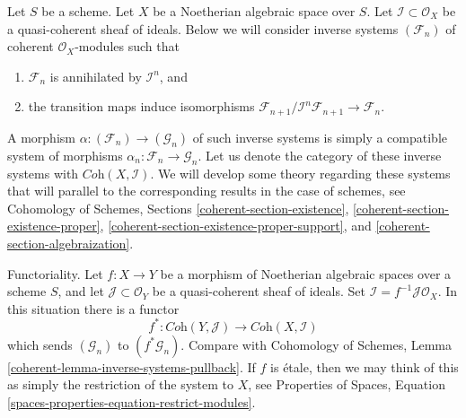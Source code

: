 \medskip\noindent
Let $S$ be a scheme. Let $X$ be a Noetherian algebraic space over $S$.
Let $\mathcal{I} \subset \mathcal{O}_X$ be a quasi-coherent sheaf of ideals.
Below we will consider inverse systems $(\mathcal{F}_n)$ of coherent
$\mathcal{O}_X$-modules such that
\begin{enumerate}
\item $\mathcal{F}_n$ is annihilated by $\mathcal{I}^n$, and
\item the transition maps induce isomorphisms
$\mathcal{F}_{n + 1}/\mathcal{I}^n\mathcal{F}_{n + 1} \to \mathcal{F}_n$.
\end{enumerate}
A morphism $\alpha : (\mathcal{F}_n) \to (\mathcal{G}_n)$
of such inverse systems is simply a compatible system of morphisms
$\alpha_n : \mathcal{F}_n \to \mathcal{G}_n$.
Let us denote the category of these inverse systems with
$\textit{Coh}(X, \mathcal{I})$. We will develop some theory regarding
these systems that will parallel to the corresponding
results in the case of schemes, see
Cohomology of Schemes, Sections \ref{coherent-section-existence},
\ref{coherent-section-existence-proper},
\ref{coherent-section-existence-proper-support}, and
\ref{coherent-section-algebraization}.

\medskip\noindent
Functoriality. Let $f : X \to Y$ be a
morphism of Noetherian algebraic spaces over a scheme $S$, and
let $\mathcal{J} \subset \mathcal{O}_Y$ be a quasi-coherent sheaf
of ideals. Set $\mathcal{I} = f^{-1}\mathcal{J}\mathcal{O}_X$.
In this situation there is a functor
$$
f^* : \textit{Coh}(Y, \mathcal{J}) \longrightarrow \textit{Coh}(X, \mathcal{I})
$$
which sends $(\mathcal{G}_n)$ to $(f^*\mathcal{G}_n)$. Compare with
Cohomology of Schemes, Lemma \ref{coherent-lemma-inverse-systems-pullback}.
If $f$ is \'etale, then we may think of this as simply the restriction
of the system to $X$, see Properties of Spaces, 
Equation \ref{spaces-properties-equation-restrict-modules}.

